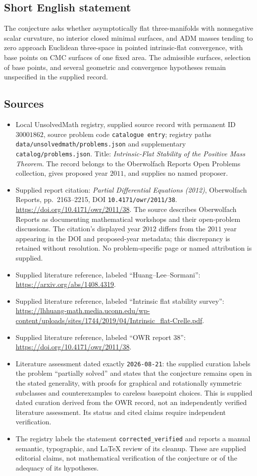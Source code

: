 \documentclass[11pt]{article}
\begin{document}
\subsection{Short English statement}
The conjecture asks whether asymptotically flat three-manifolds with nonnegative scalar curvature, no interior closed minimal surfaces, and ADM masses tending to zero approach Euclidean three-space in pointed intrinsic-flat convergence, with base points on CMC surfaces of one fixed area. The admissible surfaces, selection of base points, and several geometric and convergence hypotheses remain unspecified in the supplied record.
\subsection{Sources}
\begin{itemize}
\item Local UnsolvedMath registry, supplied source record with permanent ID \(30001862\), source problem code \texttt{catalogue entry}; registry paths \texttt{data/unsolvedmath/problems.json} and supplementary \texttt{catalog/problems.json}. Title: \emph{Intrinsic-Flat Stability of the Positive Mass Theorem}. The record belongs to the Oberwolfach Reports Open Problems collection, gives proposed year \(2011\), and supplies no named proposer.
\item Supplied report citation: \emph{Partial Differential Equations (2012)}, Oberwolfach Reports, pp.\ 2163--2215, DOI \texttt{10.4171/owr/2011/38}. \url{https://doi.org/10.4171/owr/2011/38}. The source describes Oberwolfach Reports as documenting mathematical workshops and their open-problem discussions. The citation's displayed year \(2012\) differs from the \(2011\) year appearing in the DOI and proposed-year metadata; this discrepancy is retained without resolution. No problem-specific page or named attribution is supplied.
\item Supplied literature reference, labeled ``Huang--Lee--Sormani'': \url{https://arxiv.org/abs/1408.4319}.
\item Supplied literature reference, labeled ``Intrinsic flat stability survey'': \url{https://lhhuang-math.media.uconn.edu/wp-content/uploads/sites/1744/2019/04/Intrinsic_flat-Crelle.pdf}.
\item Supplied literature reference, labeled ``OWR report 38'': \url{https://doi.org/10.4171/owr/2011/38}.
\item Literature assessment dated exactly \texttt{2026-08-21}: the supplied curation labels the problem ``partially solved'' and states that the conjecture remains open in the stated generality, with proofs for graphical and rotationally symmetric subclasses and counterexamples to careless basepoint choices. This is supplied dated curation derived from the OWR record, not an independently verified literature assessment. Its status and cited claims require independent verification.
\item The registry labels the statement \texttt{corrected\_verified} and reports a manual semantic, typographic, and LaTeX review of its cleanup. These are supplied editorial claims, not mathematical verification of the conjecture or of the adequacy of its hypotheses.
\end{itemize}
\end{document}
